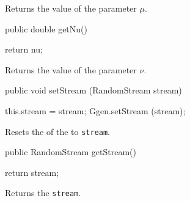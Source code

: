 \begin{tabb}
Returns the value of the parameter $\mu$.
\end{tabb}
\begin{code}

   public double getNu() \begin{hide} { return nu; }\end{hide}
\end{code}
\begin{tabb}
Returns the value of the parameter $\nu$.
\end{tabb}
\begin{code}

   public void setStream (RandomStream stream) \begin{hide} {
        this.stream = stream;
        Ggen.setStream (stream);
    }\end{hide}
\end{code}
\begin{tabb}
Resets the 
of the 
to \texttt{stream}.
\end{tabb}
\begin{code}

   public RandomStream getStream() \begin{hide} { return stream; }\end{hide}
\end{code}
\begin{tabb}
Returns the  \texttt{stream}.
\end{tabb}
\begin{code} \begin{hide}

    protected void init() {
    // init of StochasticProcess only sets path[0] = x0 if observation times are set.
        super.init();
        muOverNu  = mu / nu;
        mu2OverNu = mu * mu / nu;
        mu2dtOverNu = new double[d];
        if (observationTimesSet) {
            for (int i = 0; i < d; i++)
                mu2dtOverNu[i] = mu2OverNu * (t[i+1] - t[i]);
        }
    }

}\end{hide}
\end{code}
